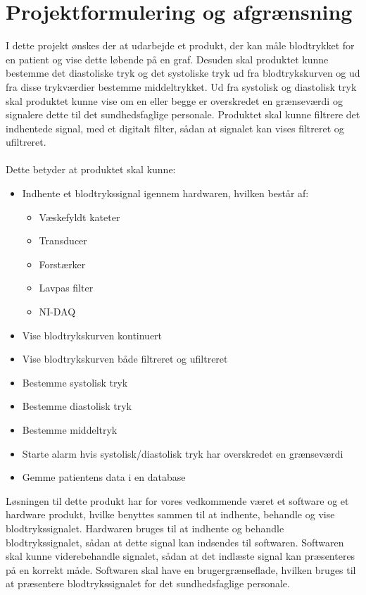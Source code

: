 \chapter{Projektformulering og afgrænsning}
I dette projekt ønskes der at udarbejde et produkt, der kan måle blodtrykket for en patient og vise dette løbende på en graf. Desuden skal produktet kunne bestemme det diastoliske tryk og det systoliske tryk ud fra blodtrykskurven og ud fra disse trykværdier bestemme middeltrykket. Ud fra systolisk og diastolisk tryk skal produktet kunne vise om en eller begge er overskredet en grænseværdi og signalere dette til det sundhedsfaglige personale. Produktet skal kunne filtrere det indhentede signal, med et digitalt filter, sådan at signalet kan vises filtreret og ufiltreret.  \\\\
Dette betyder at produktet skal kunne:
\begin{itemize}
\item Indhente et blodtrykssignal igennem hardwaren, hvilken består af:
\begin{itemize}
\item Væskefyldt kateter
\item Transducer 
\item Forstærker
\item Lavpas filter
\item NI-DAQ
\end{itemize}
\item Vise blodtrykskurven kontinuert
\item Vise blodtrykskurven både filtreret og ufiltreret
\item Bestemme systolisk tryk
\item Bestemme diastolisk tryk
\item Bestemme middeltryk
\item Starte alarm hvis systolisk/diastolisk tryk har overskredet en grænseværdi
\item Gemme patientens data i en database
\end{itemize}
Løsningen til dette produkt har for vores vedkommende været et software og et hardware produkt, hvilke benyttes sammen til at indhente, behandle og vise blodtrykssignalet. Hardwaren bruges til at indhente og behandle blodtrykssignalet, sådan at dette signal kan indsendes til softwaren. Softwaren skal kunne viderebehandle signalet, sådan at det indlæste signal kan præsenteres på en korrekt måde. Softwaren skal have en brugergrænseflade, hvilken bruges til at præsentere blodtrykssignalet for det sundhedsfaglige personale. \\
